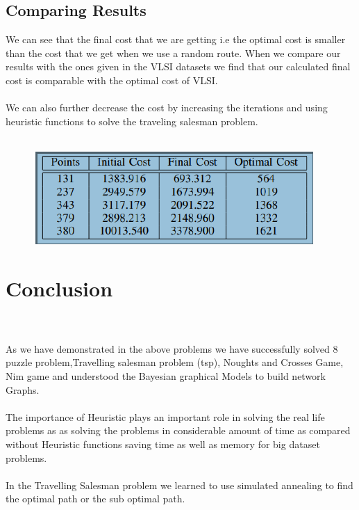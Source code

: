 \documentclass[conference]{IEEEtran}
\begin{document}
\subsection{Comparing Results}
 We can see that the final cost that we are getting i.e the optimal cost is smaller than the cost that we get when we use a random route. When we compare our results with the ones given in the VLSI datasets we find that our calculated final cost is comparable with the optimal cost of VLSI.
\\
\\
We can also further decrease the cost by increasing the iterations and using heuristic functions to solve the traveling salesman problem.
\\
\\
\begin{figure}[htbp]
\centerline{\includegraphics[scale=0.8]{mst.png}}

\label{fig}
\end{figure}

\section*{Conclusion}
\\
\\
As we have demonstrated in the above problems we have successfully solved 8 puzzle problem,Travelling salesman problem (tsp), Noughts and Crosses Game, Nim game and understood the Bayesian graphical Models to build network Graphs.
\\
\\
The importance of Heuristic plays an important role in solving the real life problems as as solving the problems in considerable amount of time as compared without Heuristic functions saving time as well as memory for big dataset problems.
\\
\\
In the Travelling Salesman problem we learned to use simulated annealing to find the optimal path or the sub optimal path.
\\
\\
\end{document}
